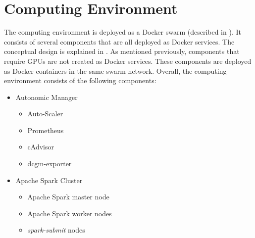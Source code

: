 \section{Computing Environment}
\label{sec:06_env}
The computing environment is deployed as a Docker swarm (described in ). It consists of several components that are all deployed as Docker services. The conceptual design is explained in .
As mentioned previously, components that require GPUs are not created as Docker services. These components are deployed as Docker containers in the same swarm network.
Overall, the computing environment consists of the following components:
\begin{itemize}
\item Autonomic Manager
\begin{itemize}
\item Auto-Scaler
\item Prometheus
\item cAdvisor
\item dcgm-exporter
\end{itemize}

\item Apache Spark Cluster
\begin{itemize}
\item Apache Spark master node
\item Apache Spark worker nodes
\item \textit{spark-submit} nodes
\end{itemize}
\end{itemize}


